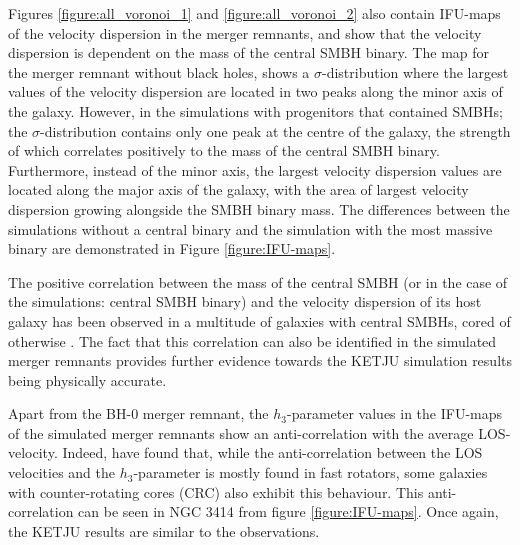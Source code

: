 \documentclass[english, oneside]{HYgradu}
\begin{document}
Figures \ref{figure:all_voronoi_1} and \ref{figure:all_voronoi_2} also contain IFU-maps of the velocity dispersion in the merger remnants, and show that the velocity dispersion is dependent on the mass of the central SMBH binary. The map for the merger remnant without black holes, shows a $\sigma$-distribution where the largest values of the velocity dispersion are located in two peaks along the minor axis of the galaxy. However, in the simulations with progenitors that contained SMBHs; the $\sigma$-distribution contains only one peak at the centre of the galaxy, the strength of which correlates positively to the mass of the central SMBH binary. Furthermore, instead of the minor axis, the largest velocity dispersion values are located along the major axis of the galaxy, with the area of largest velocity dispersion growing alongside the SMBH binary mass. The differences between the simulations without a central binary and the simulation with the most massive binary are demonstrated in Figure \ref{figure:IFU-maps}.

The positive correlation between the mass of the central SMBH (or in the case of the simulations: central SMBH binary) and the velocity dispersion of its host galaxy has been observed in a multitude of galaxies with central SMBHs, cored of otherwise \citep{Ferrarese2000}. The fact that this correlation can also be identified in the simulated merger remnants provides further evidence towards the KETJU simulation results being physically accurate. %

Apart from the BH-0 merger remnant, the $h_3$-parameter values in the IFU-maps of the simulated merger remnants show an anti-correlation with the average LOS-velocity. Indeed, \cite{Krajnovic2011} have found that, while the anti-correlation between the LOS velocities and the $h_3$-parameter is mostly found in fast rotators, some galaxies with counter-rotating cores (CRC) also exhibit this behaviour. This anti-correlation can be seen in NGC 3414 from figure \ref{figure:IFU-maps}. Once again, the KETJU results are similar to the observations.
\end{document}
